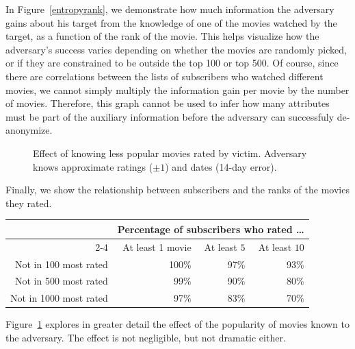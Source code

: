 \documentclass[11pt]{article}
\begin{document}
\begin{appendix}
In Figure~\ref{entropyrank}, we demonstrate how much information
the adversary gains about his target from the knowledge of one of
the movies watched by the target, as a function of the rank of the
movie. This helps visualize how the adversary's success varies depending
on whether the movies are randomly picked, or if they are constrained
to be outside the top 100 or top 500.  Of course, since there are
correlations between the lists of subscribers who watched different
movies, we cannot simply multiply the information gain per movie by the
number of movies. Therefore, this graph cannot be used to infer how
many attributes must be part of the auxiliary information before the
adversary can successfuly de-anonymize.

\begin{figure}
\begin{minipage}[b]{0.47\linewidth}
\centering
\mbox{}
\caption{Entropy of movie by rank\label{entropyrank}}
\end{minipage}
\begin{minipage}[b]{0.47\linewidth}
\centering
\mbox{}
\caption{Effect of knowing less popular movies rated by victim. Adversary knows approximate ratings ($\pm 1$) and dates (14-day error).} \label{fig:mrp}  
\end{minipage}

\end{figure}

Finally, we show the relationship between subscribers and the ranks of
the movies they rated.

\vspace{1ex}
\begin{tabular}{|r|r|r|r|}
\hline
&
\multicolumn{3}{c|}{
Percentage of subscribers who rated \ldots} \\ \cline{2-4}
& At least 1 movie & At least $5$ & At least $10$ \\
\hline
Not in 100 most rated &
100\% & 97\% & 93\% \\ \hline
Not in 500 most rated &
99\% & 90\% & 80\% \\ \hline
Not in 1000 most rated &
97\% & 83\% & 70\% \\ \hline
\end{tabular}
\vspace{1ex}

Figure~\ref{fig:mrp} explores in greater detail the effect of the
popularity of movies known to the adversary.  The effect is not
negligible, but not dramatic either.



\end{appendix}
\end{document}
